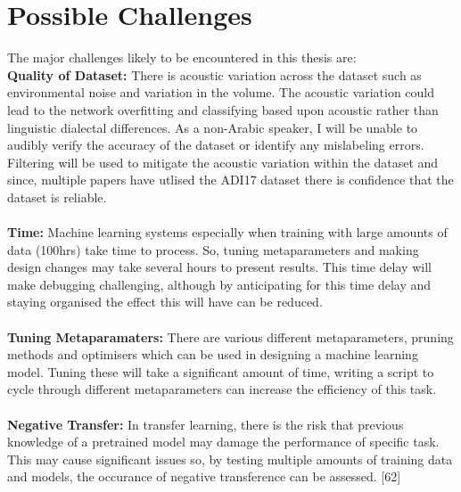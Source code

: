 \section{Possible Challenges}
The major challenges likely to be encountered in this thesis are:\\
\textbf{Quality of Dataset:} There is acoustic variation across the dataset such as environmental noise and variation in the volume. 
The acoustic variation could lead to the network overfitting and classifying based upon acoustic rather than linguistic dialectal differences. 
As a non-Arabic speaker, I will be unable to audibly verify the accuracy of the dataset or identify any mislabeling errors.
Filtering will be used to mitigate the acoustic variation within the dataset and 
since, multiple papers have utlised the ADI17 dataset there is confidence that the dataset is reliable.\\\\
\textbf{Time:} Machine learning systems especially when training with large amounts of data (100hrs) take time to process. So, tuning metaparameters 
and making design changes may take several hours to present results. This time delay will make debugging challenging, 
although by anticipating for this time delay and staying organised the effect this will have can be reduced. \\\\
\textbf{Tuning Metaparamaters:}
There are various different metaparameters, pruning methods and optimisers which can be used in designing a machine learning model. Tuning these will 
take a significant amount of time, writing a script to cycle through different metaparameters can increase the efficiency of this task.\\\\
\textbf{Negative Transfer:} In transfer learning, there is the risk that previous knowledge of a pretrained model may 
damage the performance of specific task. This may cause significant issues so, by testing multiple amounts of training data and models, the occurance of  
negative transference can be assessed. [62]